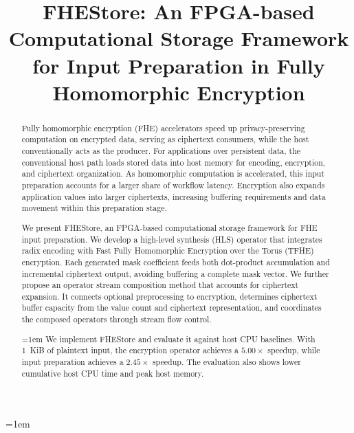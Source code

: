 \documentclass[sigconf,anonymous,balance=false]{acmart}
\title[FHEStore: A Framework for FHE Input Preparation]{FHEStore: An FPGA-based Computational Storage Framework for Input Preparation in Fully Homomorphic Encryption}
\begin{document}
\begin{abstract}
Fully homomorphic encryption (FHE) accelerators speed up privacy-preserving computation on encrypted data, serving as ciphertext consumers, while the host conventionally acts as the producer. For applications over persistent data, the conventional host path loads stored data into host memory for encoding, encryption, and ciphertext organization. As homomorphic computation is accelerated, this input preparation accounts for a larger share of workflow latency. Encryption also expands application values into larger ciphertexts, increasing buffering requirements and data movement within this preparation stage.

We present FHEStore, an FPGA-based computational storage framework for FHE input preparation. We develop a high-level synthesis (HLS) operator that integrates radix encoding with Fast Fully Homomorphic Encryption over the Torus (TFHE) encryption. Each generated mask coefficient feeds both dot-product accumulation and incremental ciphertext output, avoiding buffering a complete mask vector. We further propose an operator stream composition method that accounts for ciphertext expansion. It connects optional preprocessing to encryption, determines ciphertext buffer capacity from the value count and ciphertext representation, and coordinates the composed operators through stream flow control.

\begingroup
\emergencystretch=1em
We implement FHEStore and evaluate it against host CPU baselines. With 1~KiB of plaintext input, the encryption operator achieves a $5.00\times$ speedup, while input preparation achieves a $2.45\times$ speedup. The evaluation also shows lower cumulative host CPU time and peak host memory.
\par\endgroup
\end{abstract}


\emergencystretch=1em
\maketitle
\emergencystretch=0pt
\end{document}
